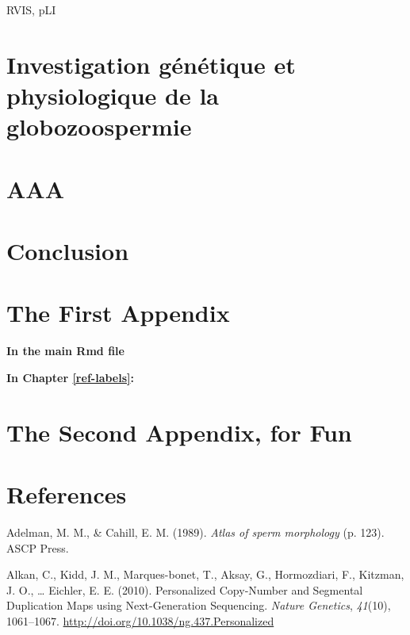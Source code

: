 \documentclass[12pt,twoside]{reedthesis}
\theoremstyle{definition}
\theoremstyle{definition}
\theoremstyle{remark}
\begin{document}
  RVIS, pLI
  
  \chapter{Investigation génétique et physiologique de la
  globozoospermie}\label{globo}
  
  \chapter{AAA}\label{aaa}
  
  \chapter*{Conclusion}\label{conclusion}
  
  \appendix
  
  \chapter{The First Appendix}\label{the-first-appendix}
  
  \textbf{In the main Rmd file}
  
  \textbf{In Chapter \ref{ref-labels}:}
  
  \chapter{The Second Appendix, for
  Fun}\label{the-second-appendix-for-fun}
  
  \backmatter
  
  \chapter*{References}\label{references}
  
  \noindent
  
  \setlength{\parindent}{-0.20in} \setlength{\leftskip}{0.20in}
  \setlength{\parskip}{8pt}
  
  \hypertarget{refs}{}
  \hypertarget{ref-Adelman1989}{}
  Adelman, M. M., \& Cahill, E. M. (1989). \emph{Atlas of sperm
  morphology} (p. 123). ASCP Press.
  
  \hypertarget{ref-Alkan2010}{}
  Alkan, C., Kidd, J. M., Marques-bonet, T., Aksay, G., Hormozdiari, F.,
  Kitzman, J. O., \ldots{} Eichler, E. E. (2010). Personalized Copy-Number
  and Segmental Duplication Maps using Next-Generation Sequencing.
  \emph{Nature Genetics}, \emph{41}(10), 1061--1067.
  \url{http://doi.org/10.1038/ng.437.Personalized}
  
\end{document}
